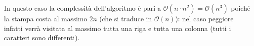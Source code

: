 \documentclass[../cheatSheetAlgoritmi.tex]{subfiles}
\begin{document}
In questo caso la complessità dell'algoritmo è pari a $\mathcal{O}(n \cdot n^{2}) = \mathcal{O}(n^{3})$ poiché la stampa costa al massimo $2n$ (che si traduce in $\mathcal{O}(n)$): nel caso peggiore infatti verrà visitata al massimo tutta una riga e tutta una colonna (tutti i caratteri sono differenti).
 
\end{document}
